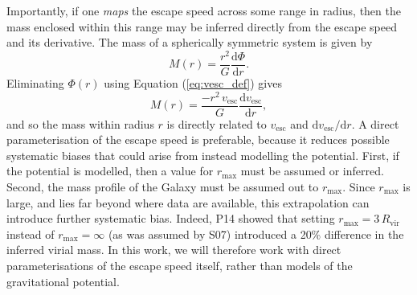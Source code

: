 \documentclass[useAMS,twocolumn,usenatbib]{mn2e}
\def\vesc{{v_\mathrm{esc}}}
\begin{document}
Importantly, if one {\it maps} the escape speed across some range in radius, then the mass enclosed within this range may be inferred directly from the escape speed and its derivative.
The mass of a spherically symmetric system is given by 
%
\begin{equation}
M(r) = \dfrac{r^2}{G}\dfrac{\mathrm{d}\Phi}{\mathrm{d}r}.
\end{equation}
%
Eliminating $\Phi(r)$ using Equation (\ref{eq:vesc_def}) gives
%
\begin{equation}
M(r) = \dfrac{-r^2\,\vesc}{G}\dfrac{\mathrm{d}\vesc}{\mathrm{d}r},
\label{eq:mass_enclosed}
\end{equation}
%
and so the mass within radius $r$ is directly related to $\vesc$ and $\mathrm{d}\vesc/\mathrm{d}r$.
A direct parameterisation of the escape speed is preferable, because it reduces possible systematic biases that could arise from instead modelling the potential.
First, if the potential is modelled, then a value for $r_\text{max}$ must be assumed or inferred.
Second, the mass profile of the Galaxy must be assumed out to $r_\text{max}$. 
Since $r_\text{max}$ is large, and lies far beyond where data are available, this extrapolation can introduce further systematic bias.
Indeed, P14 showed that setting $r_\text{max}=3\,R_\text{vir}$ instead of $r_\text{max}=\infty$ (as was assumed by S07) introduced a 20\% difference in the inferred virial mass.
In this work, we will therefore work with direct parameterisations of the escape speed itself, rather than models of the gravitational potential. 
\end{document}

